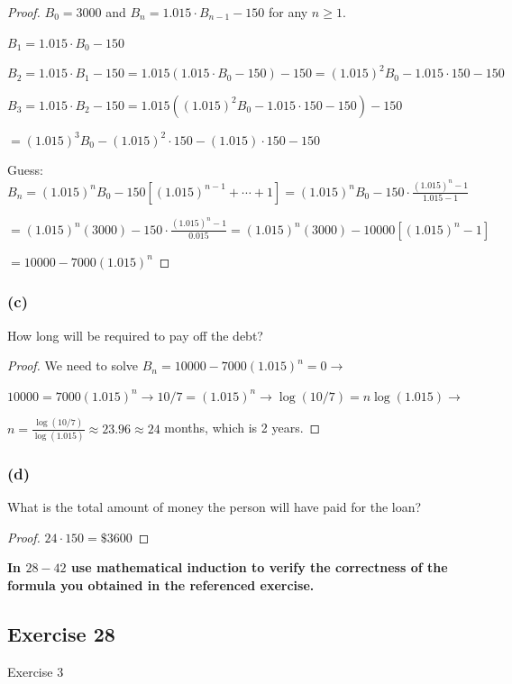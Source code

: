 \documentclass[14pt]{extarticle}
\newcommand{\dps}{\displaystyle}
\newcommand{\cy}{\color{cyan}}
\begin{document}
\begin{proof}
\(B_0 = 3000\) and \(B_n = 1.015 \cdot B_{n-1} - 150\) for any \(n \geq 1\).

\(B_1 = 1.015 \cdot B_0 - 150\)

\(B_2 = 1.015 \cdot B_1 - 150 = 1.015(1.015 \cdot B_0 - 150) - 150 = (1.015)^2 B_0 - 1.015 \cdot 150 - 150\)

\(B_3 = 1.015 \cdot B_2 - 150 = 1.015((1.015)^2 B_0 - 1.015 \cdot 150 - 150) - 150\)

\(= (1.015)^3 B_0 - (1.015)^2 \cdot 150 - (1.015) \cdot 150 - 150\)

Guess: \(B_n = (1.015)^n B_0 - 150[(1.015)^{n-1} + \cdots + 1] 
= \dps (1.015)^n B_0 - 150 \cdot \frac{(1.015)^n - 1}{1.015 - 1}\)

\( = \dps (1.015)^n (3000) - 150 \cdot \frac{(1.015)^n - 1}{0.015} = (1.015)^n (3000) - 10000[(1.015)^n - 1]\)

\(= 10000 - 7000 (1.015)^n\)
\end{proof}

\subsubsection{(c)}
How long will be required to pay off the debt?

\begin{proof}
We need to solve \(B_n = 10000 - 7000 (1.015)^n = 0 \to\)

\(10000 = 7000(1.015)^n \to 10/7 = (1.015)^n \to \log(10/7) = n \log(1.015) \to\)

\(\dps n = \frac{\log(10/7)}{\log(1.015)} \approx 23.96 \approx 24\) months, which is 2 years.
\end{proof}

\subsubsection{(d)}
What is the total amount of money the person will have paid for the loan?

\begin{proof}
\(24 \cdot 150 = \$3600\)
\end{proof}

{\bf \cy In $28-42$ use mathematical induction to verify the correctness of the formula you obtained in the 
referenced exercise.}

\subsection{Exercise 28}
Exercise 3
\end{document}
